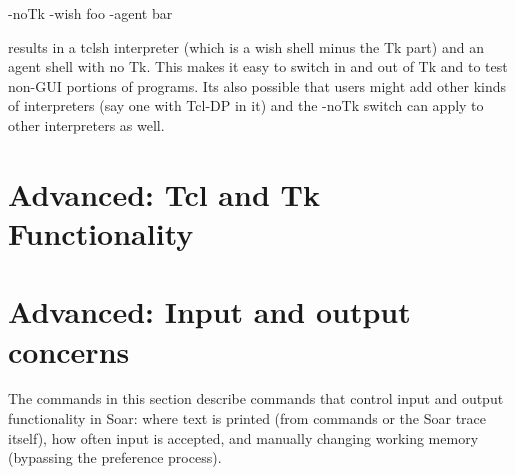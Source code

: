 {{	-noTk -wish foo -agent bar 

	results in a tclsh interpreter (which is a wish shell minus the Tk
	part) and an agent shell with no Tk.  This makes it easy to switch in
	and out of Tk and to test non-GUI portions of programs.  Its also
	possible that users might add other kinds of interpreters (say one
	with Tcl-DP in it) and the -noTk switch can apply to other
	interpreters as well.
	}


\section{Advanced: Tcl and Tk Functionality}
\label{INTERFACE-advanced-tcl}


\section{Advanced: Input and output concerns}
\label{INTERFACE-advanced-io}

The commands in this section describe commands that control input and output
functionality in Soar: where text is printed (from commands or the Soar trace
itself), how often input is accepted, and manually changing working memory
(bypassing the preference process). 



}
